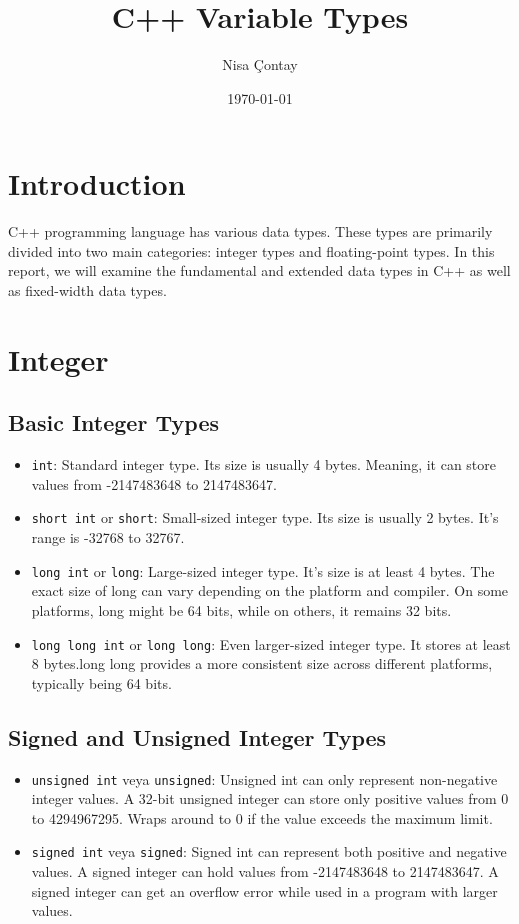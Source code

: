 \documentclass[12pt]{article}
\title{\LARGE C++ Variable Types}
\author{\LARGE Nisa Çontay}
\date{\today}
\begin{document}
\maketitle

\newpage


\section{Introduction}
C++ programming language has various data types. These types are primarily divided into two main categories: integer types and floating-point types. In this report, we will examine the fundamental and extended data types in C++ as well as fixed-width data types.
\section{Integer}

\subsection{Basic Integer Types}
\begin{itemize}
    \item \texttt{int}: Standard integer type. Its size is usually 4 bytes. Meaning, it can store values from -2147483648 to 2147483647.
    \item \texttt{short int} or \texttt{short}: Small-sized integer type. Its size is usually 2 bytes. It's range is -32768 to 32767.
    \item \texttt{long int} or \texttt{long}: Large-sized integer type. It's size is at least 4 bytes. The exact size of long can vary depending on the platform and compiler. On some platforms, long might be 64 bits, while on others, it remains 32 bits.
    \item \texttt{long long int} or \texttt{long long}: Even larger-sized integer type. It stores at least 8 bytes.long long provides a more consistent size across different platforms, typically being 64 bits.
\end{itemize}

\subsection{Signed and Unsigned Integer Types}
\begin{itemize}
    \item \texttt{unsigned int} veya \texttt{unsigned}: Unsigned int can only represent non-negative integer values. A 32-bit unsigned integer can store only positive values from 0 to 4294967295. Wraps around to 0 if the value exceeds the maximum limit.
    \item \texttt{signed int} veya \texttt{signed}: Signed int can represent both positive and negative values. A signed integer can hold values from -2147483648 to 2147483647. A signed integer can get an overflow error while used in a program with larger values.
\end{itemize}
\end{document}
